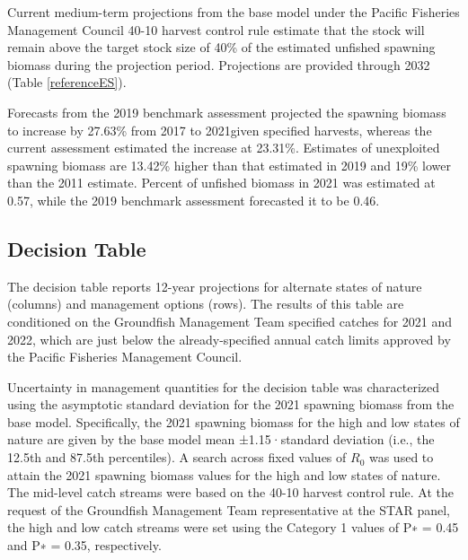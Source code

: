 \documentclass[11pt,
  english,
  a4paper,
]{article}
\begin{document}
Current medium-term projections from the base model under the Pacific Fisheries Management Council 40-10 harvest control rule estimate that the stock will remain above the target stock size of 40\% of the estimated unfished spawning biomass during the projection period. Projections are provided through 2032 (Table \ref{referenceES}).

\leavevmode\tagmcend\tagstructend\par


Forecasts from the 2019 benchmark assessment projected the spawning biomass to increase by 27.63\% from 2017 to 2021given specified harvests, whereas the current assessment estimated the increase at 23.31\%. Estimates of unexploited spawning biomass are 13.42\% higher than that estimated in 2019 and 19\% lower than the 2011 estimate. Percent of unfished biomass in 2021 was estimated at 0.57, while the 2019 benchmark assessment forecasted it to be 0.46.

\leavevmode\tagmcend\tagstructend\par


\hypertarget{decision-table}{%
\subsection*{Decision Table}\label{decision-table}}

\leavevmode\tagmcend\tagstructend


The decision table reports 12-year projections for alternate states of nature (columns) and management options (rows). The results of this table are conditioned on the Groundfish Management Team specified catches for 2021 and 2022, which are just below the already-specified annual catch limits approved by the Pacific Fisheries Management Council.

\leavevmode\tagmcend\tagstructend\par


Uncertainty in management quantities for the decision table was characterized using the asymptotic standard deviation for the 2021 spawning biomass from the base model. Specifically, the 2021 spawning biomass for the high and low states of nature are given by the base model mean ±1.15·standard deviation (i.e., the 12.5th and 87.5th percentiles). A search across fixed values of {\(R_0\)\leavevmode\tagmcend\tagstructend} was used to attain the 2021 spawning biomass values for the high and low states of nature. The mid-level catch streams were based on the 40-10 harvest control rule. At the request of the Groundfish Management Team representative at the STAR panel, the high and low catch streams were set using the Category 1 values of P∗ = 0.45 and P∗ = 0.35, respectively.
\end{document}
